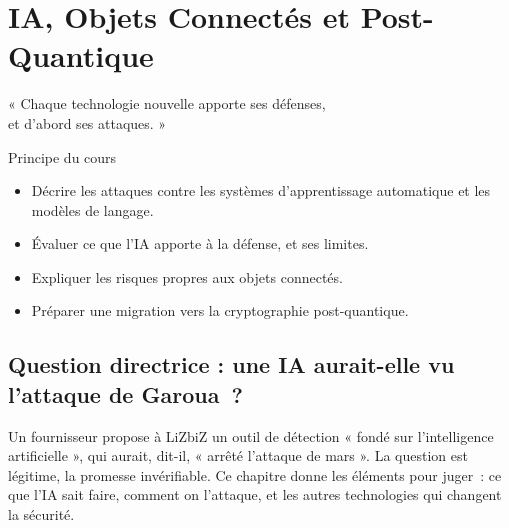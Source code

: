 
\chapter{IA, Objets Connectés et Post-Quantique}
\label{chap:emergents}

\epigraph{%
    « Chaque technologie nouvelle apporte ses défenses,\\
    et d'abord ses attaques. »%
}{Principe du cours}


\begin{boxobjectifs}
\begin{itemize}
    \item Décrire les attaques contre les systèmes d'apprentissage
          automatique et les modèles de langage.
    \item Évaluer ce que l'IA apporte à la défense, et ses limites.
    \item Expliquer les risques propres aux objets connectés.
    \item Préparer une migration vers la cryptographie post-quantique.
\end{itemize}
\end{boxobjectifs}

\bigskip

\section*{Question directrice : une IA aurait-elle vu l'attaque de Garoua~?}

Un fournisseur propose à LiZbiZ un outil de détection « fondé sur
l'intelligence artificielle », qui aurait, dit-il, « arrêté l'attaque de
mars ». La question est légitime, la promesse invérifiable. Ce chapitre
donne les éléments pour juger~: ce que l'IA sait faire, comment on
l'attaque, et les autres technologies qui changent la sécurité.

